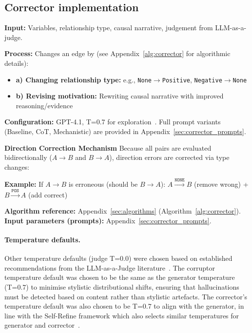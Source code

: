 \subsection{Corrector implementation}
\textbf{Input:} Variables, relationship type, causal narrative, judgement from LLM-as-a-judge.

\textbf{Process:} Changes an edge by (see Appendix~\ref{alg:corrector} for algorithmic details):
\begin{itemize}[noitemsep]
    \item \textbf{a) Changing relationship type:} e.g., \texttt{None}$\rightarrow$\texttt{Positive}, \texttt{Negative}$\rightarrow$\texttt{None}
    \item \textbf{b) Revising motivation:} Rewriting causal narrative with improved reasoning/evidence
\end{itemize}

\textbf{Configuration:} GPT-4.1, T=0.7 for exploration~\citep{madaan2023selfrefineiterativerefinementselffeedback}. Full prompt variants (Baseline, CoT, Mechanistic) are provided in Appendix~\ref{sec:corrector_prompts}.

\noindent\textbf{Direction Correction Mechanism}
Because all pairs are evaluated bidirectionally ($A \rightarrow B$ and $B \rightarrow A$), direction errors are corrected via type changes:

\textbf{Example:} If $A \rightarrow B$ is erroneous (should be $B \rightarrow A$):
$A \xrightarrow{\texttt{NONE}} B$ (remove wrong) + $B \xrightarrow{\texttt{POS}} A$ (add correct)

\textbf{Algorithm reference:} Appendix~\ref{sec:algorithms} (Algorithm~\ref{alg:corrector}). \textbf{Input parameters (prompts):} Appendix~\ref{sec:corrector_prompts}.

\paragraph{Temperature defaults.}
Other temperature defaults (judge T=0.0) were chosen based on established recommendations from the LLM-as-a-Judge literature~\citep{liu2023gevalnlgevaluationusing, zheng2024judging}. The corruptor temperature default was chosen to be the same as the generator temperature (T=0.7) to minimise stylistic distributional shifts, ensuring that hallucinations must be detected based on content rather than stylistic artefacts. The corrector's temperature default was also chosen to be T=0.7 to align with the generator, in line with the Self-Refine framework which also selects similar temperatures for generator and corrector~\citep{madaan2023selfrefineiterativerefinementselffeedback}.

